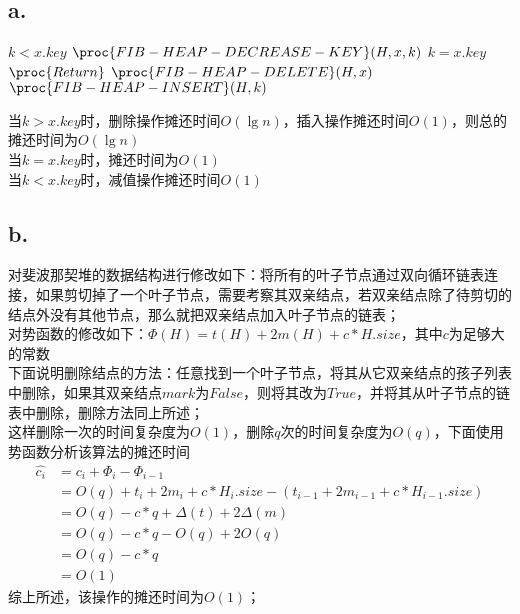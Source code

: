 \documentclass{article}
\begin{document}
  		\subsection*{a.}
  			\begin{codebox}
  				\li \If $k<x.key$
  				\li \Then $\proc{FIB-HEAP-DECREASE-KEY}(H,x,k)$
  				\End
  				\li \If $k=x.key$
  				\li \Then $\proc{Return}$
  				\End
  				\li $\proc{FIB-HEAP-DELETE}(H,x)$
  				\li $\proc{FIB-HEAP-INSERT}(H,k)$
  			\end{codebox}
  			当$k>x.key$时，删除操作摊还时间$O(\lg{n})$，插入操作摊还时间$O(1)$，则总的摊还时间为$O(\lg{n})$ \\
  			当$k=x.key$时，摊还时间为$O(1)$ \\
  			当$k<x.key$时，减值操作摊还时间$O(1)$
  		\subsection*{b.}
  			对斐波那契堆的数据结构进行修改如下：将所有的叶子节点通过双向循环链表连接，如果剪切掉了一个叶子节点，需要考察其双亲结点，若双亲结点除了待剪切的结点外没有其他节点，那么就把双亲结点加入叶子节点的链表；\\
  			对势函数的修改如下：$\Phi(H)=t(H)+2m(H)+c*H.size$，其中$c$为足够大的常数\\
  			下面说明删除结点的方法：任意找到一个叶子节点，将其从它双亲结点的孩子列表中删除，如果其双亲结点$mark$为$False$，则将其改为$True$，并将其从叶子节点的链表中删除，删除方法同上所述；\\
  			这样删除一次的时间复杂度为$O(1)$，删除$q$次的时间复杂度为$O(q)$，下面使用势函数分析该算法的摊还时间
  			\begin{align*}
  				\hat{c_i} &= c_i+\Phi_i-\Phi_{i-1} \\
  				&= O(q)+t_i+2m_i+c*H_i.size-(t_{i-1}+2m_{i-1}+c*H_{i-1}.size) \\
  				&= O(q)-c*q+\Delta(t)+2\Delta(m) \\
  				&= O(q)-c*q-O(q)+2O(q) \\
  				&= O(q)-c*q \\
  				&= O(1)
  			\end{align*}
  			综上所述，该操作的摊还时间为$O(1)$；
\end{document}
